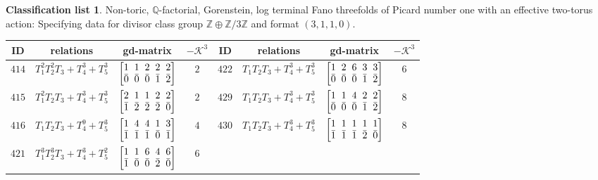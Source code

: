 \documentclass[pdftex]{sigma}%
\theoremstyle{definition}
\newtheorem{class-list}[thm]{Classification list}
\def\ZZ{{\mathbb Z}}
\def\QQ{{\mathbb Q}}
\numberwithin{equation}{section}
\begin{document}
\begin{class-list}
Non-toric, $\QQ$-factorial, Gorenstein, log terminal Fano
threefolds of Picard number one with an effective two-torus action:
Specifying data for divisor class group $\ZZ\oplus \ZZ/3\ZZ$
and format $(3,1,1,0)$.
\begin{table}[h!]\centering\setlength{\tabcolsep}{3.5pt}
\renewcommand{\arraystretch}{1.35}\small\tabulinesep=1mm
\begin{tabu}{c|c|c|c||c|c|c|c}
\hline
ID&relations&gd-matrix&$-\mathcal{K}^3$&ID&relations&gd-matrix&$-\mathcal{K}^3$
\\
\hline
${414}$&${T_{1}^{2}T_{2}^{2}T_{3}+T_{4}^{3}+T_{5}^{3}}$
&$\arraycolsep=1mm\begin{bmatrix}{1} & {1} & {2} & {2} & {2} \\ {\bar{0}} & {\bar{0}} & {\bar{0}} & {\bar{1}} & {\bar{2}}\end{bmatrix}$&${2}$
&${422}$&${T_{1}T_{2}T_{3}+T_{4}^{3}+T_{5}^{3}}$
&$\arraycolsep=1mm\begin{bmatrix}{1} & {2} & {6} & {3} & {3} \\ {\bar{0}} & {\bar{0}} & {\bar{0}} & {\bar{1}} & {\bar{2}}\end{bmatrix}$&${6}$
\\
\hline
${415}$&${T_{1}^{2}T_{2}T_{3}+T_{4}^{3}+T_{5}^{3}}$
&$\arraycolsep=1mm\begin{bmatrix}{2} & {1} & {1} & {2} & {2} \\ {\bar{1}} & {\bar{2}} & {\bar{2}} & {\bar{2}} & {\bar{0}}\end{bmatrix}$&${2}$
&${429}$&${T_{1}T_{2}T_{3}+T_{4}^{3}+T_{5}^{3}}$
&$\arraycolsep=1mm\begin{bmatrix}{1} & {1} & {4} & {2} & {2} \\ {\bar{0}} & {\bar{0}} & {\bar{0}} & {\bar{1}} & {\bar{2}}\end{bmatrix}$&${8}$
\\
\hline
${416}$&${T_{1}T_{2}T_{3}+T_{4}^{9}+T_{5}^{3}}$
&$\arraycolsep=1mm\begin{bmatrix}{1} & {4} & {4} & {1} & {3} \\ {\bar{1}} & {\bar{1}} & {\bar{1}} & {\bar{0}} & {\bar{1}}\end{bmatrix}$&${4}$
&${430}$&${T_{1}T_{2}T_{3}+T_{4}^{3}+T_{5}^{3}}$
&$\arraycolsep=1mm\begin{bmatrix}{1} & {1} & {1} & {1} & {1} \\ {\bar{1}} & {\bar{1}} & {\bar{1}} & {\bar{2}} & {\bar{0}}\end{bmatrix}$&${8}$
\\
\hline
${421}$&${T_{1}^{3}T_{2}^{3}T_{3}+T_{4}^{3}+T_{5}^{2}}$
&$\arraycolsep=1mm\begin{bmatrix}{1} & {1} & {6} & {4} & {6} \\ {\bar{1}} & {\bar{0}} & {\bar{0}} & {\bar{2}} & {\bar{0}}\end{bmatrix}$&${6}$
\\
\end{tabu}\vspace{2mm}
\end{table}
\end{class-list}
\end{document}
